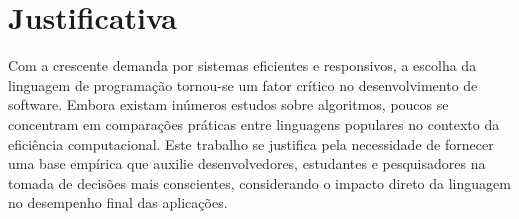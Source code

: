 \documentclass[12pt,oneside,a4paper]{report}
\begin{document}
\chapter{Justificativa}
Com a crescente demanda por sistemas eficientes e responsivos, a escolha da linguagem de programação tornou-se um fator crítico no desenvolvimento de software. Embora existam inúmeros estudos sobre algoritmos, poucos se concentram em comparações práticas entre linguagens populares no contexto da eficiência computacional. Este trabalho se justifica pela necessidade de fornecer uma base empírica que auxilie desenvolvedores, estudantes e pesquisadores na tomada de decisões mais conscientes, considerando o impacto direto da linguagem no desempenho final das aplicações.





\end{document}
